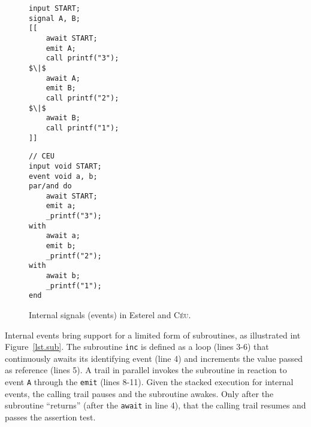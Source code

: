 \documentclass{acm_proc_article-sp}
\newcommand{\CEU}{\textsc{C\'{e}u}\xspace}
\newcommand{\code}[1] {{\small{\texttt{#1}}}}
\newcommand{\1}{\;}
\newcommand{\2}{\;\;}
\newcommand{\3}{\;\;\;}
\newcommand{\5}{\;\;\;\;\;}
\begin{document}
\begin{figure}[!t]
\begin{minipage}[t]{0.50\linewidth}
\begin{lstlisting}[mathescape=true]
% ESTEREL
input START;
signal A, B;
[[
    await START;
    emit A;
    call printf("3");
$\|$
    await A;
    emit B;
    call printf("2");
$\|$
    await B;
    call printf("1");
]]
\end{lstlisting}
\end{minipage}
%
\begin{minipage}[t]{0.45\linewidth}
\begin{lstlisting}
// CEU
input void START;
event void a, b;
par/and do
    await START;
    emit a;
    _printf("3");
with
    await a;
    emit b;
    _printf("2");
with
    await b;
    _printf("1");
end
\end{lstlisting}
\end{minipage}
\caption{ Internal signals (events) in Esterel and \CEU. \newline
\label{lst.prints}
}
\end{figure}

\begin{comment}
{\small
The order of execution for the \code{printf} calls in Esterel is unspecified.
For \CEU, they always print $1$, $2$, and $3$, in this exact order.
}
Signals in Esterel have immediate feedback, i.e., an \code{await} statement can 
react to an \code{emit} in the same time it is reached.
In \CEU, only previously awaiting trails can react to an event.

immediate feedback
    flip-flops
- synthesis of digital circuits
immediate feedback (digital components as simple as flip-flops

causality complications
Note that both internal and external events are unbuffered, i.e., at the moment 
an event occurs, only previously awaiting trails can react to that instance.
\end{comment}

Internal events bring support for a limited form of subroutines, as illustrated 
int Figure~\ref{lst.sub}.
The subroutine \code{inc} is defined as a loop (lines 3-6) that continuously 
awaits its identifying event (line 4) and increments the value passed as 
reference (lines 5).
A trail in parallel invokes the subroutine in reaction to event \code{A} 
through the \code{emit} (lines 8-11).
Given the stacked execution for internal events, the calling trail pauses and 
the subroutine awakes.
Only after the subroutine ``returns'' (after the \code{await} in line 4), that 
the calling trail resumes and passes the assertion test.
 
\end{document}
